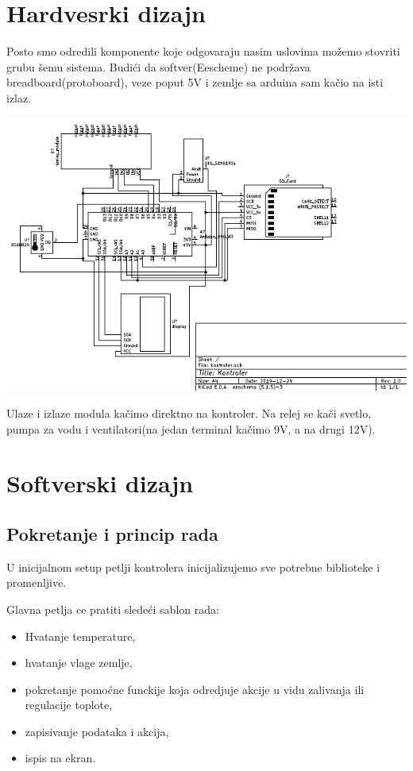 \documentclass[a4paper,11pt]{book}
\begin{document}
\section{Hardvesrki dizajn}

Posto smo odredili komponente koje odgovaraju nasim uslovima možemo stovriti grubu šemu sistema. Budići da softver(Eescheme) ne podržava breadboard(protoboard), veze poput 5V i zemlje sa arduina sam kačio na isti izlaz. 

\includegraphics[width=\textwidth]{kontroler.png}

Ulaze i izlaze modula kačimo direktno na kontroler. Na relej se kači svetlo, pumpa za vodu i ventilatori(na jedan terminal kačimo 9V, a na drugi 12V).

\section{Softverski dizajn}

\subsection{Pokretanje i princip rada}

U inicijalnom setup petlji kontrolera inicijalizujemo sve potrebne biblioteke i promenljive. 

Glavna petlja ce pratiti sledeći sablon rada:

\hrulefill
\begin{itemize}
  \item Hvatanje temperature,
  \item hvatanje vlage zemlje,
  \item pokretanje pomoćne funckije koja odredjuje akcije u vidu zalivanja ili regulacije toplote,
  \item zapisivanje podataka i akcija,
  \item ispis na ekran.
\end{itemize}
\hrulefill
\end{document}
